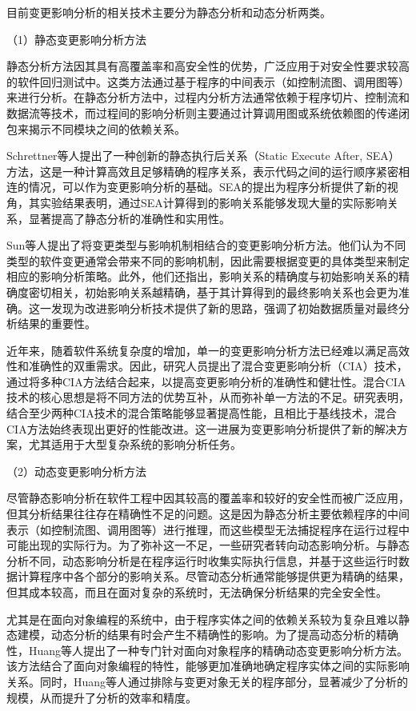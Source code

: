 目前变更影响分析的相关技术主要分为静态分析和动态分析两类。

（1）静态变更影响分析方法

静态分析方法因其具有高覆盖率和高安全性的优势，广泛应用于对安全性要求较高的软件回归测试中。这类方法通过基于程序的中间表示（如控制流图、调用图等）来进行分析。在静态分析方法中，过程内分析方法通常依赖于程序切片、控制流和数据流等技术\cite{2004Efficient,1991Using}，而过程间的影响分析则主要通过计算调用图或系统依赖图的传递闭包来揭示不同模块之间的依赖关系\cite{JitenderKumarChhabra2018Improved, 2011An, 2013Analyzing}。

Schrettner等人\cite{Department2013Impact}提出了一种创新的静态执行后关系（Static Execute After, SEA）方法，这是一种计算高效且足够精确的程序关系，表示代码之间的运行顺序紧密相连的情况，可以作为变更影响分析的基础。SEA的提出为程序分析提供了新的视角，其实验结果表明，通过SEA计算得到的影响关系能够发现大量的实际影响关系，显著提高了静态分析的准确性和实用性。

Sun等人\cite{5676283}提出了将变更类型与影响机制相结合的变更影响分析方法。他们认为不同类型的软件变更通常会带来不同的影响机制，因此需要根据变更的具体类型来制定相应的影响分析策略。此外，他们还指出，影响关系的精确度与初始影响关系的精确度密切相关，初始影响关系越精确，基于其计算得到的最终影响关系也会更为准确。这一发现为改进影响分析技术提供了新的思路，强调了初始数据质量对最终分析结果的重要性。

近年来，随着软件系统复杂度的增加，单一的变更影响分析方法已经难以满足高效性和准确性的双重需求。因此，研究人员提出了混合变更影响分析（CIA）技术，通过将多种CIA方法结合起来，以提高变更影响分析的准确性和健壮性\cite{2021Improving}。混合CIA技术的核心思想是将不同方法的优势互补，从而弥补单一方法的不足。研究表明，结合至少两种CIA技术的混合策略能够显著提高性能，且相比于基线技术，混合CIA方法始终表现出更好的性能改进。这一进展为变更影响分析提供了新的解决方案，尤其适用于大型复杂系统的影响分析任务。

（2）动态变更影响分析方法

尽管静态影响分析在软件工程中因其较高的覆盖率和较好的安全性而被广泛应用，但其分析结果往往存在精确性不足的问题。这是因为静态分析主要依赖程序的中间表示（如控制流图、调用图等）进行推理，而这些模型无法捕捉程序在运行过程中可能出现的实际行为。为了弥补这一不足，一些研究者转向动态影响分析。与静态分析不同，动态影响分析是在程序运行时收集实际执行信息，并基于这些运行时数据计算程序中各个部分的影响关系。尽管动态分析通常能够提供更为精确的结果，但其成本较高，而且在面对复杂的系统时，无法确保分析结果的完全安全性。

尤其是在面向对象编程的系统中，由于程序实体之间的依赖关系较为复杂且难以静态建模，动态分析的结果有时会产生不精确性的影响。为了提高动态分析的精确性，Huang等人\cite{2007Precise}提出了一种专门针对面向对象程序的精确动态变更影响分析方法。该方法结合了面向对象编程的特性，能够更加准确地确定程序实体之间的实际影响关系。同时，Huang等人通过排除与变更对象无关的程序部分，显著减少了分析的规模，从而提升了分析的效率和精度。

